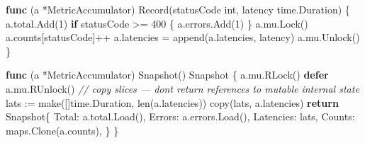 \documentclass[
]{article}
\newenvironment{Shaded}{}{}
\newcommand{\BuiltInTok}[1]{\textcolor[rgb]{0.00,0.50,0.00}{#1}}
\newcommand{\CommentTok}[1]{\textcolor[rgb]{0.38,0.63,0.69}{\textit{#1}}}
\newcommand{\ControlFlowTok}[1]{\textcolor[rgb]{0.00,0.44,0.13}{\textbf{#1}}}
\newcommand{\DataTypeTok}[1]{\textcolor[rgb]{0.56,0.13,0.00}{#1}}
\newcommand{\DecValTok}[1]{\textcolor[rgb]{0.25,0.63,0.44}{#1}}
\newcommand{\KeywordTok}[1]{\textcolor[rgb]{0.00,0.44,0.13}{\textbf{#1}}}
\newcommand{\NormalTok}[1]{#1}
\newcommand{\OperatorTok}[1]{\textcolor[rgb]{0.40,0.40,0.40}{#1}}
\begin{document}
\begin{Shaded}
\begin{Highlighting}[]
\KeywordTok{func} \OperatorTok{(}\NormalTok{a }\OperatorTok{*}\NormalTok{MetricAccumulator}\OperatorTok{)}\NormalTok{ Record}\OperatorTok{(}\NormalTok{statusCode }\DataTypeTok{int}\OperatorTok{,}\NormalTok{ latency time}\OperatorTok{.}\NormalTok{Duration}\OperatorTok{)} \OperatorTok{\{}
\NormalTok{    a}\OperatorTok{.}\NormalTok{total}\OperatorTok{.}\NormalTok{Add}\OperatorTok{(}\DecValTok{1}\OperatorTok{)}
    \ControlFlowTok{if}\NormalTok{ statusCode }\OperatorTok{\textgreater{}=} \DecValTok{400} \OperatorTok{\{}
\NormalTok{        a}\OperatorTok{.}\NormalTok{errors}\OperatorTok{.}\NormalTok{Add}\OperatorTok{(}\DecValTok{1}\OperatorTok{)}
    \OperatorTok{\}}
\NormalTok{    a}\OperatorTok{.}\NormalTok{mu}\OperatorTok{.}\NormalTok{Lock}\OperatorTok{()}
\NormalTok{    a}\OperatorTok{.}\NormalTok{counts}\OperatorTok{[}\NormalTok{statusCode}\OperatorTok{]++}
\NormalTok{    a}\OperatorTok{.}\NormalTok{latencies }\OperatorTok{=} \BuiltInTok{append}\OperatorTok{(}\NormalTok{a}\OperatorTok{.}\NormalTok{latencies}\OperatorTok{,}\NormalTok{ latency}\OperatorTok{)}
\NormalTok{    a}\OperatorTok{.}\NormalTok{mu}\OperatorTok{.}\NormalTok{Unlock}\OperatorTok{()}
\OperatorTok{\}}

\KeywordTok{func} \OperatorTok{(}\NormalTok{a }\OperatorTok{*}\NormalTok{MetricAccumulator}\OperatorTok{)}\NormalTok{ Snapshot}\OperatorTok{()}\NormalTok{ Snapshot }\OperatorTok{\{}
\NormalTok{    a}\OperatorTok{.}\NormalTok{mu}\OperatorTok{.}\NormalTok{RLock}\OperatorTok{()}
    \ControlFlowTok{defer}\NormalTok{ a}\OperatorTok{.}\NormalTok{mu}\OperatorTok{.}\NormalTok{RUnlock}\OperatorTok{()}
    \CommentTok{// copy slices — don\textquotesingle{}t return references to mutable internal state}
\NormalTok{    lats }\OperatorTok{:=} \BuiltInTok{make}\OperatorTok{([]}\NormalTok{time}\OperatorTok{.}\NormalTok{Duration}\OperatorTok{,} \BuiltInTok{len}\OperatorTok{(}\NormalTok{a}\OperatorTok{.}\NormalTok{latencies}\OperatorTok{))}
    \BuiltInTok{copy}\OperatorTok{(}\NormalTok{lats}\OperatorTok{,}\NormalTok{ a}\OperatorTok{.}\NormalTok{latencies}\OperatorTok{)}
    \ControlFlowTok{return}\NormalTok{ Snapshot}\OperatorTok{\{}
\NormalTok{        Total}\OperatorTok{:}\NormalTok{     a}\OperatorTok{.}\NormalTok{total}\OperatorTok{.}\NormalTok{Load}\OperatorTok{(),}
\NormalTok{        Errors}\OperatorTok{:}\NormalTok{    a}\OperatorTok{.}\NormalTok{errors}\OperatorTok{.}\NormalTok{Load}\OperatorTok{(),}
\NormalTok{        Latencies}\OperatorTok{:}\NormalTok{ lats}\OperatorTok{,}
\NormalTok{        Counts}\OperatorTok{:}\NormalTok{    maps}\OperatorTok{.}\NormalTok{Clone}\OperatorTok{(}\NormalTok{a}\OperatorTok{.}\NormalTok{counts}\OperatorTok{),}
    \OperatorTok{\}}
\OperatorTok{\}}
\end{Highlighting}
\end{Shaded}
\end{document}
